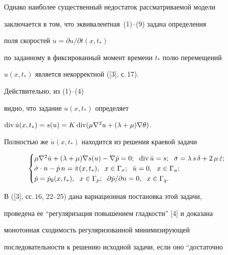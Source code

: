 Однако наиболее существенный недостаток рассматриваемой модели


заключается в том, что эквивалентная~(1)--(9) задача определения


поля скоростей $\Dot u = \partial u/\partial t(x,t_*)$


по заданному в фиксированный момент времени $t_*$ полю перемещений


$u(x,t_*)$ является некорректной ([3], с.\,17).


Действительно, из (1)--(4)


видно, что задание $u(x,t_{*})$ определяет


$\Div \Dot u(x,t_{*})=s(u)=K \Div(\mu \nabla^{2} u


+ (\lambda+\mu) \nabla \theta)$.


Полностью же $\Dot u (x,t_{*})$ находится из решения краевой задачи


\begin{equation}


\begin{cases}


\mu \nabla^{2} \Dot u + (\lambda+\mu) \nabla s(u) -\nabla \dot p =0;\ \;


\Div \Dot u = s;\ \;


\Dot \sigma = \lambda \,s \, \delta +


2 \,\mu \, \Dot \varepsilon; \\


\Dot \sigma \cdot n - \Dot p \,n = \Dot \pi(x,t_{*}), \ \;


x \in \Gamma_{\sigma};\ \;


\Dot u =0, \ \; x \in \Gamma_{u}; \\


\Dot p = \Dot p_{0} (x,t_{*}), \ \; x \in \Gamma_{p}; \ \;


\partial \Dot p/\partial n =0, \ \; x \in \Gamma_{q}.


\end{cases}


\end{equation}


В ([3], сс.\,16, 22--25) дана вариационная постановка этой задачи,


проведена ее ``регуляризация повышением гладкости'' [4] и доказана


монотонная сходимость регуляризованной минимизирующей


последовательности к решению исходной задачи, если оно ``достаточно


